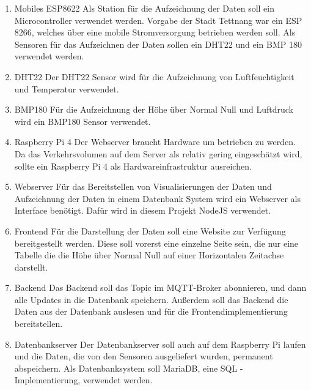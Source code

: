 \begin{enumerate}
	\item Mobiles ESP8622 \newline
	Als Station für die Aufzeichnung der Daten soll ein Microcontroller verwendet werden. Vorgabe der Stadt Tettnang war ein ESP 8266, welches über eine mobile Stromversorgung betrieben werden soll. 
	Als Sensoren für das Aufzeichnen der Daten sollen ein DHT22 und ein BMP 180 verwendet werden.
	
	\item DHT22 \newline
	Der DHT22 Sensor wird für die Aufzeichnung von Luftfeuchtigkeit und Temperatur verwendet.
	
	\item BMP180 \newline
	Für die Aufzeichnung der Höhe über Normal Null und Luftdruck wird ein BMP180 Sensor verwendet.
	
	\item Raspberry Pi 4 \newline
	Der Webserver braucht Hardware um betrieben zu werden. Da das Verkehrsvolumen auf dem Server als relativ gering eingeschätzt wird, sollte ein Raspberry Pi 4 als Hardwareinfrastruktur ausreichen.
	
	\item Webserver \newline
	Für das Bereitstellen von Visualisierungen der Daten und Aufzeichnung der Daten in einem Datenbank System wird ein Webserver als Interface benötigt. Dafür wird in diesem Projekt NodeJS verwendet.
	
	\item Frontend \newline
	Für die Darstellung der Daten soll eine Website zur Verfügung bereitgestellt werden. Diese soll vorerst eine einzelne Seite sein, die nur eine Tabelle die die Höhe über Normal Null auf einer Horizontalen Zeitachse darstellt.
	
	\item Backend \newline
	Das Backend soll das Topic im MQTT-Broker abonnieren, und dann alle Updates in die Datenbank speichern. Außerdem soll das Backend die Daten aus der Datenbank auslesen und für die Frontendimplementierung bereitstellen.
	
	\item Datenbankserver \newline
	Der Datenbankserver soll auch auf dem Raspberry Pi laufen und die Daten, die von den Sensoren ausgeliefert wurden, permanent abspeichern. Als Datenbanksystem soll MariaDB, eine SQL -Implementierung, verwendet werden.
	

\end{enumerate}
